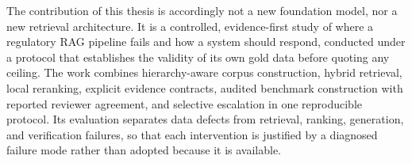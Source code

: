 The contribution of this thesis is accordingly not a new foundation model, nor a new retrieval architecture. It is a controlled, evidence-first study of where a regulatory \ac{RAG} pipeline fails and how a system should respond, conducted under a protocol that establishes the validity of its own gold data before quoting any ceiling. The work combines hierarchy-aware corpus construction, hybrid retrieval, local reranking, explicit evidence contracts, audited benchmark construction with reported reviewer agreement, and selective escalation in one reproducible protocol. Its evaluation separates data defects from retrieval, ranking, generation, and verification failures, so that each intervention is justified by a diagnosed failure mode rather than adopted because it is available.
